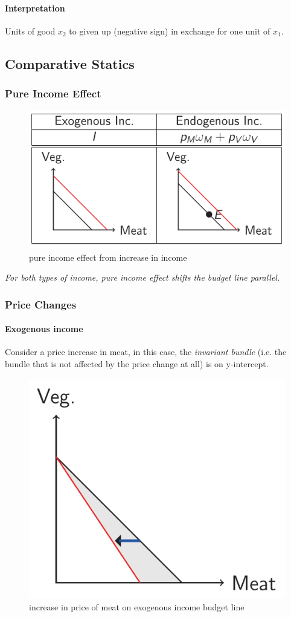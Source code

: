 \documentclass{article}
\begin{document}
			\paragraph{Interpretation} Units of good $x_2$ to given up (negative sign) in exchange for one unit of $x_1$.
	
		\subsection{Comparative Statics}
			\subsubsection{Pure Income Effect}
			\begin{figure}[h]
				\centering
				\includegraphics[width=0.8\linewidth]{figure/lec1_1}
				\caption{pure income effect from increase in income}
			\end{figure}
			\emph{For both types of income, pure income effect shifts the budget line parallel.}
			\newpage
			\subsubsection{Price Changes}
				\paragraph{Exogenous income} Consider a price increase in meat, in this case, the \emph{invariant bundle} (i.e. the bundle that is not affected by the price change at all) is on y-intercept.
				\begin{figure}[h]
					\centering
					\includegraphics[width=0.5\linewidth]{figure/lec1_2}
					\caption{increase in price of meat on exogenous income budget line}
				\end{figure}
				
\end{document}
